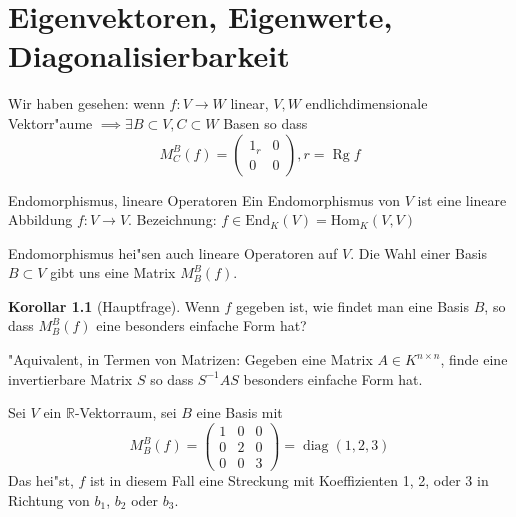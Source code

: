 \documentclass[oneside,fontsize=11pt,paper=a4,BCOR=0mm,DIV=12,automark,headsepline]{scrbook}
\DeclareMathOperator{\mRg}{Rg}
\DeclareMathOperator{\mDiag}{diag}
\theoremstyle{remark}
\theoremstyle{definition}
\newtheorem*{korollar}{Korollar}
\theoremstyle{definition}
\theoremstyle{remark}
\begin{document}
\chapter{Eigenvektoren, Eigenwerte, Diagonalisierbarkeit}

Wir haben gesehen: wenn \(f: V\to W\) linear, \(V, W\) endlichdimensionale Vektorr"aume \(\implies \exists B\subset V, C\subset W \) Basen so dass
\[M^B_C(f) = \begin{pmatrix}
    1_r & 0\\
    0 & 0
  \end{pmatrix}, r = \mRg f\]

\begin{definition}{Endomorphismus, lineare Operatoren}{}
  Ein Endomorphismus von \(V\) ist eine lineare Abbildung \(f: V\to V\). Bezeichnung: \(f\in \text{End}_K(V) = \text{Hom}_K(V,V) \)	
  
  Endomorphismus hei"sen auch lineare Operatoren auf \(V\). Die Wahl einer Basis \(B\subset V \) gibt uns eine Matrix \(M^B_B(f)\).
\end{definition}
\begin{korollar}[Hauptfrage]
  Wenn \(f\) gegeben ist, wie findet man eine Basis \(B\), so dass \(M^B_B(f)\) eine besonders einfache Form hat?
  
  "Aquivalent, in Termen von Matrizen: Gegeben eine Matrix \(A\in K^{n\times n} \), finde eine invertierbare Matrix \(S\) so dass \(S^{-1}AS\) besonders einfache Form hat.
\end{korollar}
Sei \(V\) ein \(\mathbb{R}\)-Vektorraum, sei \(B\) eine Basis mit \[M^B_B(f) =
  \begin{pmatrix}
    1 & 0 & 0 \\
    0 & 2 & 0 \\
    0 & 0 & 3
  \end{pmatrix} = \mDiag(1,2,3) \]
Das hei"st, \(f\) ist in diesem Fall eine Streckung mit Koeffizienten 1, 2, oder 3 in Richtung von \(b_1\), \(b_2\) oder \(b_{3}\).
\end{document}
